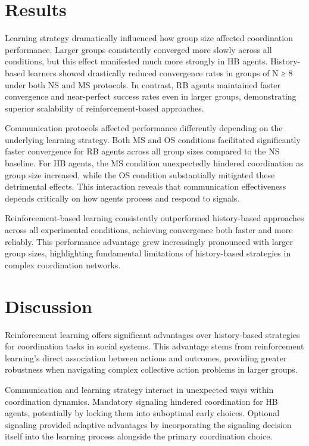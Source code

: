 \documentclass[12pt,a4paper]{article}
\begin{document}
\section{Results}

Learning strategy dramatically influenced how group size affected coordination performance. Larger groups consistently converged more slowly across all conditions, but this effect manifested much more strongly in HB agents. History-based learners showed drastically reduced convergence rates in groups of N ≥ 8 under both NS and MS protocols. In contrast, RB agents maintained faster convergence and near-perfect success rates even in larger groups, demonstrating superior scalability of reinforcement-based approaches.

Communication protocols affected performance differently depending on the underlying learning strategy. Both MS and OS conditions facilitated significantly faster convergence for RB agents across all group sizes compared to the NS baseline. For HB agents, the MS condition unexpectedly hindered coordination as group size increased, while the OS condition substantially mitigated these detrimental effects. This interaction reveals that communication effectiveness depends critically on how agents process and respond to signals.

Reinforcement-based learning consistently outperformed history-based approaches across all experimental conditions, achieving convergence both faster and more reliably. This performance advantage grew increasingly pronounced with larger group sizes, highlighting fundamental limitations of history-based strategies in complex coordination networks.

\section{Discussion}

Reinforcement learning offers significant advantages over history-based strategies for coordination tasks in social systems. This advantage stems from reinforcement learning's direct association between actions and outcomes, providing greater robustness when navigating complex collective action problems in larger groups.

Communication and learning strategy interact in unexpected ways within coordination dynamics. Mandatory signaling hindered coordination for HB agents, potentially by locking them into suboptimal early choices. Optional signaling provided adaptive advantages by incorporating the signaling decision itself into the learning process alongside the primary coordination choice.
\end{document}
